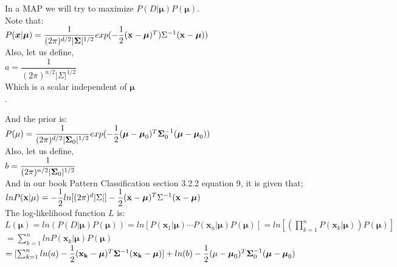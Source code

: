 \documentclass[12pt]{article}
\begin{document}
In a MAP we will try to maximize $P(D|\boldsymbol{\mu}) P(\boldsymbol{\mu}) $.\\

Note that: \\

$P( \boldsymbol{x} | \boldsymbol{\mu} ) = \dfrac{1}{(2\pi)^{d/2}|\bold \Sigma|^{1/2}}exp(-\dfrac{1}{2}(\bold{x}-\boldsymbol{\mu})^T)  \Sigma^{-1} (\bold{x}-\boldsymbol{\mu})) $ \\

Also, let us define, \\

$a= \dfrac{1}{(2\pi)^{n/2}|\Sigma|^{1/2}}$\\

Which is a scalar independent of $\boldsymbol{\mu}$\\.

And the prior is:\\

$P(\bold{\mu})  = \dfrac{1}{(2\pi)^{d/2}|\bold{\Sigma}_0|^{1/2}}exp(-\dfrac{1}{2}(\boldsymbol{\mu}-\boldsymbol{\mu}_0)^T  \bold\Sigma_0^{-1} (\boldsymbol{\mu}-\boldsymbol{\mu}_0)) $ \\

Also, let us define, \\

$b= \dfrac{1}{(2\pi)^{n/2}|\bold{\Sigma}_0|^{1/2}}$\\

And in our book Pattern Classification section 3.2.2 equation 9, it is given that;\\

$lnP(\bold{x}|\bold{\mu})= -\dfrac{1}{2}ln[(2\pi)^d|\Sigma|]-\dfrac{1}{2}(\bold{x}-\boldsymbol{\mu})^T\Sigma^{-1}(\bold{x}-\boldsymbol{\mu}) $\\

 The log-likelihood function $L$ is: \\

$L( \boldsymbol{\mu} ) = ln(P(D|\boldsymbol{\mu})P(\boldsymbol{\mu}))  = ln[ P(\boldsymbol{x}_1|\boldsymbol{\mu})\cdots P(\boldsymbol{x}_n|\boldsymbol{\mu})P(\boldsymbol{\mu})  ] = ln[(\prod_{k=1}^{n} P(\boldsymbol{x}_k|\boldsymbol{\mu}))P(\boldsymbol{\mu}) ]   $ \\

$ = \sum_{k=1}^{n} lnP(\boldsymbol{x}_k|\boldsymbol{\mu})P(\boldsymbol{\mu})  $\\

$ = [\sum_{k=1}^{n} ln(a)-\dfrac{1}{2}(\bold{x_k}-\boldsymbol{\mu})^T\bold\Sigma^{-1}(\bold{x_k}-\boldsymbol{\mu}) ]+ ln(b) -\dfrac{1}{2}(\bold{\mu}-\boldsymbol{\mu}_0)^T\bold\Sigma_0^{-1}(\boldsymbol{\mu}-\boldsymbol{\mu}_0) $\\
\end{document}
